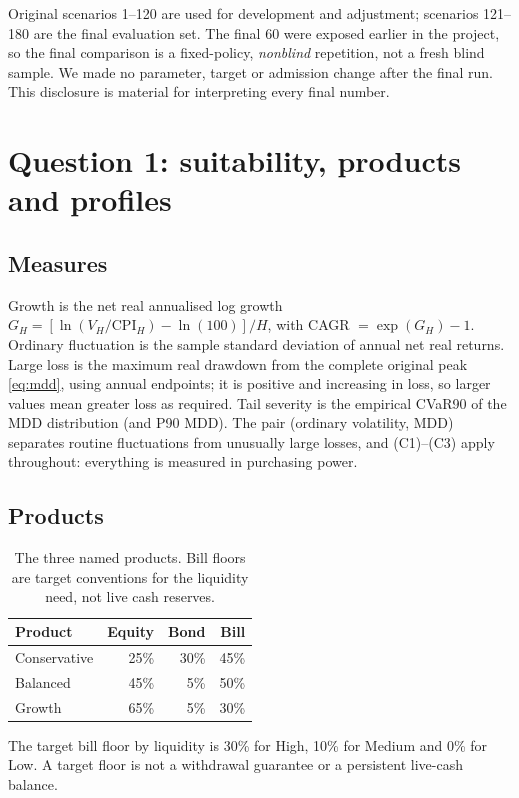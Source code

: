 \documentclass[11pt,a4paper]{article}
\begin{document}
Original scenarios 1--120 are used for development and adjustment; scenarios
121--180 are the final evaluation set. The final 60 were exposed earlier in the
project, so the final comparison is a fixed-policy, \emph{nonblind} repetition,
not a fresh blind sample. We made no parameter, target or admission change after
the final run. This disclosure is material for interpreting every final number.

\section{Question 1: suitability, products and profiles}
\label{sec:q1}

\subsection{Measures}
Growth is the net real annualised log growth
$G_H=[\ln(V_H/\mathrm{CPI}_H)-\ln(100)]/H$, with CAGR $=\exp(G_H)-1$.
Ordinary fluctuation is the sample standard deviation of annual net real returns.
Large loss is the maximum real drawdown from the complete original peak
\eqref{eq:mdd}, using annual endpoints; it is positive and increasing in loss,
so larger values mean greater loss as required. Tail severity is the empirical
CVaR90 of the MDD distribution (and P90 MDD). The pair (ordinary volatility,
MDD) separates routine fluctuations from unusually large losses, and (C1)--(C3)
apply throughout: everything is measured in purchasing power.

\subsection{Products}
\begin{table}[H]
\centering
\caption{The three named products. Bill floors are target conventions for the
liquidity need, not live cash reserves.}
\begin{tabular}{@{}lrrr@{}}
\toprule
Product & Equity & Bond & Bill \\
\midrule
Conservative & 25\% & 30\% & 45\% \\
Balanced & 45\% & 5\% & 50\% \\
Growth & 65\% & 5\% & 30\% \\
\bottomrule
\end{tabular}
\end{table}
The target bill floor by liquidity is 30\% for High, 10\% for Medium and 0\% for
Low. A target floor is not a withdrawal guarantee or a persistent live-cash
balance.
\end{document}
